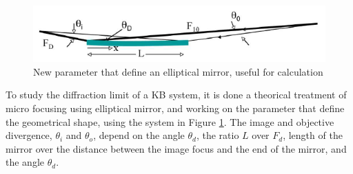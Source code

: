 \begin{figure}[H]
%
\centering
%
\includegraphics[width=.7\textwidth]{Immagini/Chapter2/System4}
%
\caption{New parameter that define an elliptical mirror, useful for calculation}
%
\label{fig: System4}
%
\end{figure}
%
To study the diffraction limit of a KB system, it is done a theorical treatment of micro focusing using elliptical mirror, and working on the parameter that define the geometrical shape, using the system in Figure \ref{fig: System4}. The image and objective divergence, $\theta_i $ and $\theta_o $, depend on the angle $\theta_d $, the ratio $L $ over $F_d $, length of the mirror over the distance between the image focus and the end of the mirror, and the angle $\theta_d $.
%

